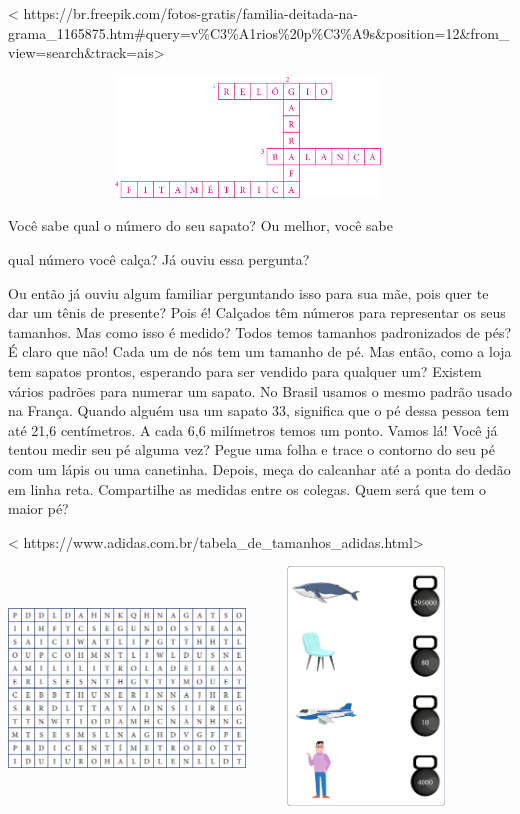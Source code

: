 \textless{}
https://br.freepik.com/fotos-gratis/familia-deitada-na-grama\_1165875.htm\#query=v\%C3\%A1rios\%20p\%C3\%A9s\&position=12\&from\_view=search\&track=ais\textgreater{}

\includegraphics[width=5.00000in,height=1.26043in]{media/image39.png}

Você sabe qual o número do seu sapato? Ou melhor, você sabe

qual número você calça? Já ouviu essa pergunta?

Ou então já ouviu algum familiar perguntando isso para sua mãe, pois
quer te dar um tênis de presente? Pois é! Calçados têm números para
representar os seus tamanhos. Mas como isso é medido? Todos temos
tamanhos padronizados de pés? É claro que não! Cada um de nós tem um
tamanho de pé. Mas então, como a loja tem sapatos prontos, esperando
para ser vendido para qualquer um? Existem vários padrões para numerar
um sapato. No Brasil usamos o mesmo padrão usado na França. Quando
alguém usa um sapato 33, significa que o pé dessa pessoa tem até 21,6
centímetros. A cada 6,6 milímetros temos um ponto. Vamos lá! Você já
tentou medir seu pé alguma vez? Pegue uma folha e trace o contorno do
seu pé com um lápis ou uma canetinha. Depois, meça do calcanhar até a
ponta do dedão em linha reta. Compartilhe as medidas entre os colegas.
Quem será que tem o maior pé?

\textless{}
https://www.adidas.com.br/tabela\_de\_tamanhos\_adidas.html\textgreater{}

\includegraphics[width=2.47525in,height=2.47010in]{media/image40.png}\includegraphics[width=2.51046in,height=2.50000in]{media/image41.png}

